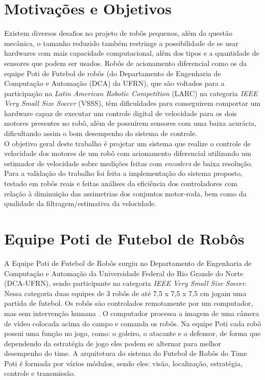 \section{Motivações e Objetivos}
Existem diversos desafios no projeto de robôs pequenos, além da questão mecânica, o tamanho reduzido também restringe a possibilidade de se usar hardwares com mais capacidade computacional, além dos tipos e a quantidade de sensores que podem ser usados. Robôs de acionamento diferencial como os da equipe Poti de Futebol de robôs (do Departamento de Engenharia de Computação e Automação (DCA) da UFRN), que são voltados para a participação na \emph{Latin American Robotic Competition} (LARC) na categoria \emph{IEEE Very Small Size Soccer} (VSSS), têm dificuldades para conseguirem comportar um hardware capaz de executar um controle digital de velocidade para os dois motores presentes no robô, além de possuírem sensores com uma baixa acurácia, dificultando assim o bom desempenho do sistema de controle.\\

O objetivo geral deste trabalho é projetar um sistema que realize o controle de velocidade dos motores de um robô com acionamento diferencial utilizando um estimador de velocidade sobre medições feitas com \emph{encoders} de baixa resolução. Para a validação do trabalho foi feita a implementação do sistema proposto, testado em robôs reais e feitas análises da eficiência dos controladores com relação à diminuição das assimetrias dos conjuntos motor-roda, bem como da qualidade da filtragem/estimativa da velocidade. %

\section{Equipe Poti de Futebol de Robôs}
\label{sec:Equipe_Poti}

A Equipe Poti de Futebol de Robôs surgiu no Departamento de Engenharia de Computação e Automação da Universidade Federal do Rio Grande do Norte (DCA-UFRN), sendo participante na categoria \emph{IEEE Very Small Size Soccer}.\\

Nessa categoria duas equipes de 3 robôs de até 7,5 x 7,5 x 7,5 cm jogam uma partida de futebol. Os robôs são controlados remotamente por um computador, mas sem intervenção humana \cite{VSSS}. O computador processa a imagem de uma câmera de vídeo colocada acima do campo e comanda os robôs. Na equipe Poti cada robô possui uma função no jogo, como: o goleiro, o atacante e o defensor, de forma que dependendo da estratégia de jogo eles podem se alternar para melhor desempenho do time. A arquitetura do sistema do Futebol de Robôs do Time Poti é formada por vários módulos, sendo eles: visão, localização, estratégia, controle e transmissão.\\

